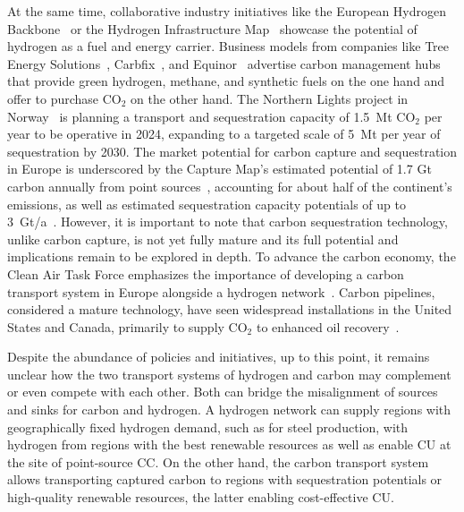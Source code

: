 \documentclass[twocolumn]{article}
\newcommand{\carbon}{CO$_2$}
\begin{document}
At the same time, collaborative industry initiatives like the European Hydrogen Backbone~\cite{gasforclimateEuropeanHydrogenBackbone2022} or the Hydrogen Infrastructure Map~\cite{H2InfrastructureMap} showcase the potential of hydrogen as a fuel and energy carrier.
Business models from companies like Tree Energy Solutions~\cite{TESHydrogenLife2023}, Carbfix~\cite{WeTurnCO2}, and Equinor~\cite{adomaitisEquinorRWEBuild2023} advertise carbon management hubs that provide green hydrogen, methane, and synthetic fuels on the one hand and offer to purchase \carbon{} on the other hand. The Northern Lights project in Norway~\cite{NorthernLightsWhat} is planning a transport and sequestration capacity of 1.5~Mt \carbon{} per year to be operative in 2024, expanding to a targeted scale of 5~Mt per year of sequestration by 2030.
The market potential for carbon capture and sequestration in Europe is underscored by the Capture Map's estimated potential of 1.7 Gt carbon annually from point sources~\cite{ToolsGreenTransition}, accounting for about half of the continent's emissions, as well as estimated sequestration capacity potentials of up to 3~Gt/a~\cite{europeancommissionEuropeanCO2Storage}. However, it is important to note that carbon sequestration technology, unlike carbon capture, is not yet fully mature and its full potential and implications remain to be explored in depth.
To advance the carbon economy, the Clean Air Task Force emphasizes the importance of developing a carbon transport system in Europe alongside a hydrogen network~\cite{lockwoodEuropeanStrategyCarbon}. Carbon pipelines, considered a mature technology, have seen widespread installations in the United States and Canada, primarily to supply \carbon{} to enhanced oil recovery~\cite{righettiSitingCarbonDioxide2017,friedmann2020net}.

Despite the abundance of policies and initiatives, up to this point, it remains unclear how the two transport systems of hydrogen and carbon may complement or even compete with each other. Both can bridge the misalignment of sources and sinks for carbon and hydrogen. A hydrogen network can supply regions with geographically fixed hydrogen demand, such as for steel production, with hydrogen from regions with the best renewable resources as well as enable CU at the site of point-source CC. On the other hand, the carbon transport system allows transporting captured carbon to regions with sequestration potentials or high-quality renewable resources, the latter enabling cost-effective CU.
\end{document}
